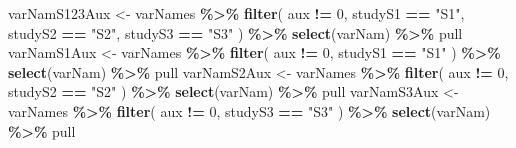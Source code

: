 \documentclass[
]{article}
\newenvironment{Shaded}{\begin{snugshade}}{\end{snugshade}}
\newcommand{\DecValTok}[1]{\textcolor[rgb]{0.00,0.00,0.81}{#1}}
\newcommand{\FunctionTok}[1]{\textcolor[rgb]{0.13,0.29,0.53}{\textbf{#1}}}
\newcommand{\NormalTok}[1]{#1}
\newcommand{\OtherTok}[1]{\textcolor[rgb]{0.56,0.35,0.01}{#1}}
\newcommand{\SpecialCharTok}[1]{\textcolor[rgb]{0.81,0.36,0.00}{\textbf{#1}}}
\newcommand{\StringTok}[1]{\textcolor[rgb]{0.31,0.60,0.02}{#1}}
\begin{document}
\begin{Shaded}
\begin{Highlighting}[]
\NormalTok{varNamS123Aux }\OtherTok{\textless{}{-}}\NormalTok{ varNames }\SpecialCharTok{\%\textgreater{}\%}
  \FunctionTok{filter}\NormalTok{(}
\NormalTok{    aux }\SpecialCharTok{!=} \DecValTok{0}\NormalTok{,}
\NormalTok{    studyS1 }\SpecialCharTok{==} \StringTok{"S1"}\NormalTok{,}
\NormalTok{    studyS2 }\SpecialCharTok{==} \StringTok{"S2"}\NormalTok{,}
\NormalTok{    studyS3 }\SpecialCharTok{==} \StringTok{"S3"}
\NormalTok{  ) }\SpecialCharTok{\%\textgreater{}\%}
  \FunctionTok{select}\NormalTok{(varNam) }\SpecialCharTok{\%\textgreater{}\%}
\NormalTok{  pull}
\NormalTok{varNamS1Aux }\OtherTok{\textless{}{-}}\NormalTok{ varNames }\SpecialCharTok{\%\textgreater{}\%}
  \FunctionTok{filter}\NormalTok{(}
\NormalTok{    aux }\SpecialCharTok{!=} \DecValTok{0}\NormalTok{,}
\NormalTok{    studyS1 }\SpecialCharTok{==} \StringTok{"S1"}
\NormalTok{  ) }\SpecialCharTok{\%\textgreater{}\%}
  \FunctionTok{select}\NormalTok{(varNam) }\SpecialCharTok{\%\textgreater{}\%}
\NormalTok{  pull}
\NormalTok{varNamS2Aux }\OtherTok{\textless{}{-}}\NormalTok{ varNames }\SpecialCharTok{\%\textgreater{}\%}
  \FunctionTok{filter}\NormalTok{(}
\NormalTok{    aux }\SpecialCharTok{!=} \DecValTok{0}\NormalTok{,}
\NormalTok{    studyS2 }\SpecialCharTok{==} \StringTok{"S2"}
\NormalTok{  ) }\SpecialCharTok{\%\textgreater{}\%}
  \FunctionTok{select}\NormalTok{(varNam) }\SpecialCharTok{\%\textgreater{}\%}
\NormalTok{  pull}
\NormalTok{varNamS3Aux }\OtherTok{\textless{}{-}}\NormalTok{ varNames }\SpecialCharTok{\%\textgreater{}\%}
  \FunctionTok{filter}\NormalTok{(}
\NormalTok{    aux }\SpecialCharTok{!=} \DecValTok{0}\NormalTok{,}
\NormalTok{    studyS3 }\SpecialCharTok{==} \StringTok{"S3"}
\NormalTok{  ) }\SpecialCharTok{\%\textgreater{}\%}
  \FunctionTok{select}\NormalTok{(varNam) }\SpecialCharTok{\%\textgreater{}\%}
\NormalTok{  pull}


\end{Highlighting}
\end{Shaded}
\end{document}
